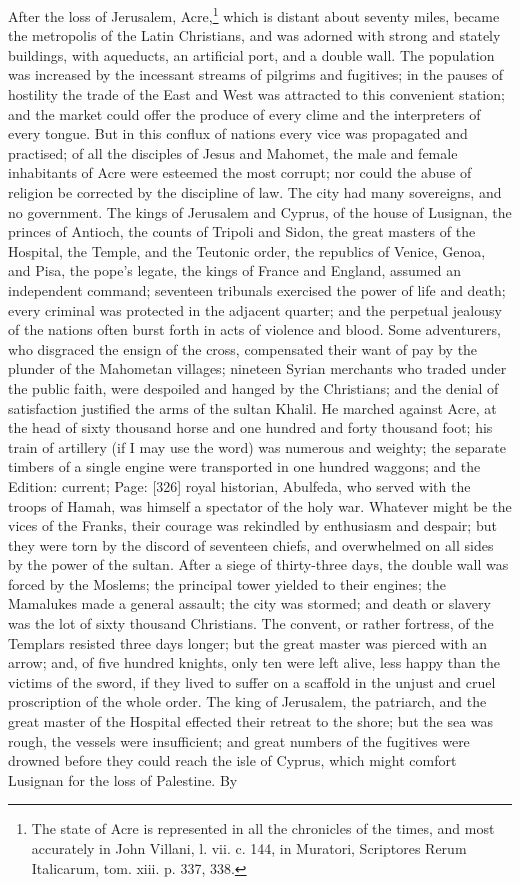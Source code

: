 After the loss of Jerusalem, Acre,\footnote{The state of Acre is represented in all the chronicles of the times, and most accurately in John Villani, l. vii. c. 144, in Muratori, Scriptores Rerum Italicarum, tom. xiii. p. 337, 338.} which is distant about seventy miles, became the metropolis of the Latin Christians, and was adorned with strong and stately buildings, with aqueducts, an artificial port, and a double wall. The population was increased by the incessant streams of pilgrims and fugitives; in the pauses of hostility the trade of the East and West was attracted to this convenient station; and the market could offer the produce of every clime and the interpreters of every tongue. But in this conflux of nations every vice was propagated and practised; of all the disciples of Jesus and Mahomet, the male and female inhabitants of Acre were esteemed the most corrupt; nor could the abuse of religion be corrected by the discipline of law. The city had many sovereigns, and no government. The kings of Jerusalem and Cyprus, of the house of Lusignan, the princes of Antioch, the counts of Tripoli and Sidon, the great masters of the Hospital, the Temple, and the Teutonic order, the republics of Venice, Genoa, and Pisa, the pope\texthebrew{}’s legate, the kings of France and England, assumed an independent command; seventeen tribunals exercised the power of life and death; every criminal was protected in the adjacent quarter; and the perpetual jealousy of the nations often burst forth in acts of violence and blood. Some adventurers, who disgraced the ensign of the cross, compensated their want of pay by the plunder of the Mahometan villages; nineteen Syrian merchants who traded under the public faith, were despoiled and hanged by the Christians; and the denial of satisfaction justified the arms of the sultan Khalil. He marched against Acre, at the head of sixty thousand horse and one hundred and forty thousand foot; his train of artillery (if I may use the word) was numerous and weighty; the separate timbers of a single engine were transported in one hundred waggons; and the Edition: current; Page: [326] royal historian, Abulfeda, who served with the troops of Hamah, was himself a spectator of the holy war. Whatever might be the vices of the Franks, their courage was rekindled by enthusiasm and despair; but they were torn by the discord of seventeen chiefs, and overwhelmed on all sides by the power of the sultan. After a siege of thirty-three days, the double wall was forced by the Moslems; the principal tower yielded to their engines; the Mamalukes made a general assault; the city was stormed; and death or slavery was the lot of sixty thousand Christians. The convent, or rather fortress, of the Templars resisted three days longer; but the great master was pierced with an arrow; and, of five hundred knights, only ten were left alive, less happy than the victims of the sword, if they lived to suffer on a scaffold in the unjust and cruel proscription of the whole order. The king of Jerusalem, the patriarch, and the great master of the Hospital effected their retreat to the shore; but the sea was rough, the vessels were insufficient; and great numbers of the fugitives were drowned before they could reach the isle of Cyprus, which might comfort Lusignan for the loss of Palestine. By 